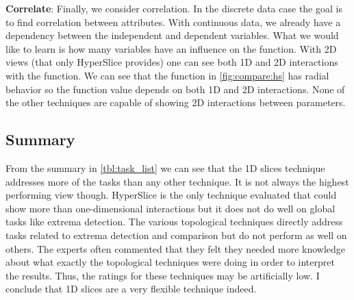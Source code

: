 \textbf{Correlate}:\label{correlate}
Finally, we consider correlation. In the discrete data case the goal is to find
correlation between attributes. With continuous data, we already have a
dependency between the independent and dependent variables. What we would like
to learn is how many variables have an influence on the function. With 2D views
(that only HyperSlice provides) one can see both 1D and 2D interactions with
the function. We can see that the function in \autoref{fig:compare:hs} has
radial behavior so the function value depends on both 1D and 2D interactions.
None of the other techniques are capable of showing 2D interactions between
parameters.

\subsection{Summary}

From the summary in \autoref{tbl:task_list} we can see that the 1D slices
technique addresses more of the tasks than any other technique.  It is not
always the highest performing view though.  HyperSlice is the only technique 
evaluated that could show more than one-dimensional interactions but it does
not do well on global tasks like extrema detection. The various topological
techniques directly address tasks related to extrema detection and comparison
but do not perform as well on others. 
The experts often commented that they felt they needed more knowledge about
what exactly the topological techniques were doing in order to interpret
the results. Thus, the ratings for these techniques may be artificially low.
I conclude that 1D slices are a
very flexible technique indeed.  


